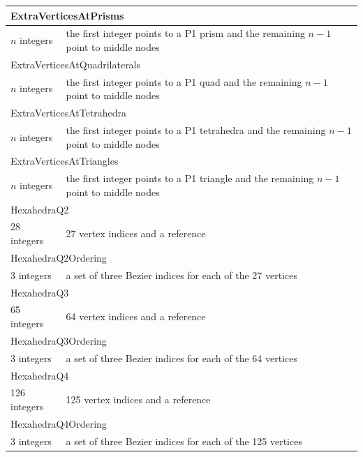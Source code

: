 \documentclass[a4paper,12pt]{article}
\begin{document}
\begin{longtable}{|m{4cm}|m{11cm}|}
\multicolumn{2}{|l|}{ExtraVerticesAtPrisms} \\
\hline
$n$ integers & the first integer points to a P1 prism and the remaining $n-1$ point to middle nodes \\
\hline\hline

\multicolumn{2}{|l|}{ExtraVerticesAtQuadrilaterals} \\
\hline
$n$ integers & the first integer points to a P1 quad and the remaining $n-1$ point to middle nodes \\
\hline\hline

\multicolumn{2}{|l|}{ExtraVerticesAtTetrahedra} \\
\hline
$n$ integers & the first integer points to a P1 tetrahedra and the remaining $n-1$ point to middle nodes \\
\hline\hline

\multicolumn{2}{|l|}{ExtraVerticesAtTriangles} \\
\hline
$n$ integers & the first integer points to a P1 triangle and the remaining $n-1$ point to middle nodes \\
\hline\hline

\multicolumn{2}{|l|}{HexahedraQ2} \\
\hline
28 integers & 27 vertex indices and a reference \\
\hline\hline

\multicolumn{2}{|l|}{HexahedraQ2Ordering} \\
\hline
3 integers & a set of three Bezier indices for each of the 27 vertices \\
\hline\hline

\multicolumn{2}{|l|}{HexahedraQ3} \\
\hline
65 integers & 64 vertex indices and a reference \\
\hline\hline

\multicolumn{2}{|l|}{HexahedraQ3Ordering} \\
\hline
3 integers & a set of three Bezier indices for each of the 64 vertices \\
\hline\hline

\multicolumn{2}{|l|}{HexahedraQ4} \\
\hline
126 integers & 125 vertex indices and a reference \\
\hline\hline

\multicolumn{2}{|l|}{HexahedraQ4Ordering} \\
\hline
3 integers & a set of three Bezier indices for each of the 125 vertices \\
\hline\hline


\end{longtable}
\end{document}
